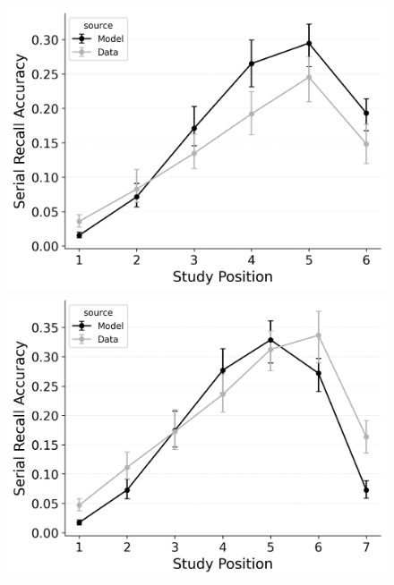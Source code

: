 \documentclass[
  man,
  floatsintext,
  longtable,
  nolmodern,
  notxfonts,
  notimes,
  draftfirst,
  colorlinks=true,linkcolor=blue,citecolor=blue,urlcolor=blue]{apa7}
\begin{document}
\begin{figure}
\begin{minipage}{0.33\linewidth}
\includegraphics{figures/bw_Gordon2021_CRU_with_Pre-Expt_and_Primacy_Confusable_Fitting_order_error_rate_LL6.png}\end{minipage}%
%
\begin{minipage}{0.33\linewidth}
\includegraphics{figures/bw_Gordon2021_CRU_with_Pre-Expt_and_Primacy_Confusable_Fitting_order_error_rate_LL7.png}\end{minipage}%
\newline
\begin{minipage}{0.33\linewidth}

\end{minipage}
\end{figure}
\end{document}

